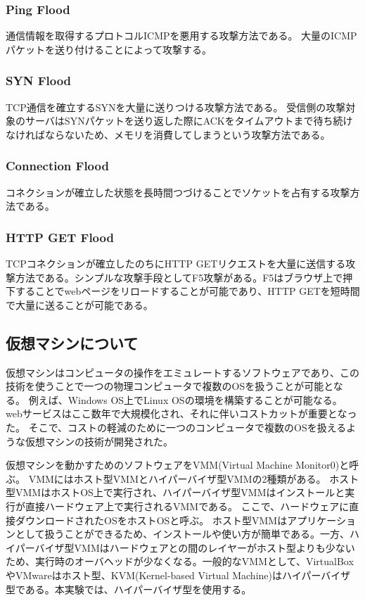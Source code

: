 \documentclass[dvipdfmx]{jsarticle}
\begin{document}
\subsubsection{Ping Flood}
通信情報を取得するプロトコルICMPを悪用する攻撃方法である。
大量のICMPパケットを送り付けることによって攻撃する。

\subsubsection{SYN Flood}
TCP通信を確立するSYNを大量に送りつける攻撃方法である。
受信側の攻撃対象のサーバはSYNパケットを送り返した際にACKをタイムアウトまで待ち続けなければならないため、メモリを消費してしまうという攻撃方法である。

\subsubsection{Connection Flood}
コネクションが確立した状態を長時間つづけることでソケットを占有する攻撃方法である。

\subsubsection{HTTP GET Flood}
TCPコネクションが確立したのちにHTTP GETリクエストを大量に送信する攻撃方法である。シンプルな攻撃手段としてF5攻撃がある。F5はブラウザ上で押下することでwebページをリロードすることが可能であり、HTTP GETを短時間で大量に送ることが可能である。

\subsection{仮想マシンについて}
仮想マシンはコンピュータの操作をエミュレートするソフトウェアであり、この技術を使うことで一つの物理コンピュータで複数のOSを扱うことが可能となる。
例えば、Windows OS上でLinux OSの環境を構築することが可能なる。
webサービスはここ数年で大規模化され、それに伴いコストカットが重要となった。
そこで、コストの軽減のために一つのコンピュータで複数のOSを扱えるような仮想マシンの技術が開発された。

仮想マシンを動かすためのソフトウェアをVMM(Virtual Machine Monitor0)と呼ぶ。
VMMにはホスト型VMMとハイパーバイザ型VMMの2種類がある。
ホスト型VMMはホストOS上で実行され、ハイパーバイザ型VMMはインストールと実行が直接ハードウェア上で実行されるVMMである。
ここで、ハードウェアに直接ダウンロードされたOSをホストOSと呼ぶ。
ホスト型VMMはアプリケーションとして扱うことができるため、インストールや使い方が簡単である。一方、ハイパーバイザ型VMMはハードウェアとの間のレイヤーがホスト型よりも少ないため、実行時のオーバヘッドが少なくなる。一般的なVMMとして、VirtualBoxやVMwareはホスト型、KVM(Kernel-based Virtual Machine)はハイパーバイザ型である。本実験では、ハイパーバイザ型を使用する。
\end{document}
